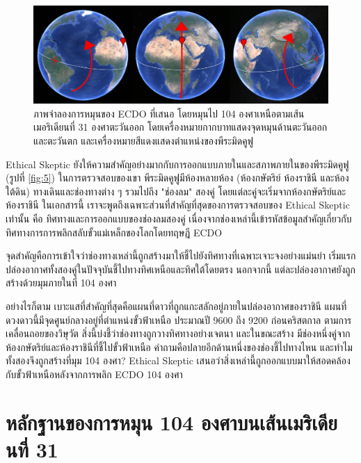 \documentclass[10pt,twocolumn,letterpaper]{article}
\begin{document}
\begin{figure}[b]
\begin{center}
\includegraphics[width=1\textwidth]{drawing.jpg}
\end{center}
   \caption{ภาพจำลองการหมุนของ ECDO ที่เสนอ โดยหมุนไป 104 องศาเหนือตามเส้นเมอริเดียนที่ 31 องศาตะวันออก โดยเครื่องหมายกากบาทแสดงจุดหมุนด้านตะวันออกและตะวันตก และเครื่องหมายสีแดงแสดงตำแหน่งของพีระมิดคูฟู }
\label{fig:6}
\end{figure}
Ethical Skeptic ยังให้ความสำคัญอย่างมากกับการออกแบบภายในและสภาพภายในของพีระมิดคูฟู (รูปที่ \ref{fig:5}) ในการตรวจสอบของเขา \cite{28} พีระมิดคูฟูมีห้องหลายห้อง (ห้องกษัตริย์ ห้องราชินี และห้องใต้ดิน) ทางเดินและช่องทางต่าง ๆ รวมไปถึง "ช่องลม" สองคู่ โดยแต่ละคู่จะเริ่มจากห้องกษัตริย์และห้องราชินี \cite{29,30} ในเอกสารนี้ เราจะพูดถึงเฉพาะส่วนที่สำคัญที่สุดของการตรวจสอบของ Ethical Skeptic เท่านั้น คือ ทิศทางและการออกแบบของช่องลมสองคู่ เนื่องจากช่องเหล่านี้เข้ารหัสข้อมูลสำคัญเกี่ยวกับทิศทางการการพลิกสลับขั้วแม่เหล็กของโลกโดยทฤษฎี ECDO 

จุดสำคัญคือการเข้าใจว่าช่องทางเหล่านี้ถูกสร้างมาให้ชี้ไปยังทิศทางที่เฉพาะเจาะจงอย่างแม่นยำ เริ่มแรก ปล่องอากาศทั้งสองคู่ในปัจจุบันชี้ไปทางทิศเหนือและทิศใต้โดยตรง นอกจากนี้ แต่ละปล่องอากาศยังถูกสร้างด้วยมุมภายในที่ 104 องศา

อย่างไรก็ตาม เบาะแสที่สำคัญที่สุดคือแผนที่ดาวที่ถูกแกะสลักอยู่ภายในปล่องอากาศของราชินี  แผนที่ดวงดาวนี้มีจุดศูนย์กลางอยู่ที่ตำแหน่งขั้วฟ้าเหนือ ประมาณปี 9600 ถึง 9200 ก่อนคริสตกาล ตามการเคลื่อนถอยของวิษุวัต  \cite{28} สิ่งนี้บ่งชี้ว่าช่องทางถูกวางทิศทางอย่างเจตนา และในขณะสร้าง มีช่องหนึ่งคู่จากห้องกษัตริย์และห้องราชินีที่ชี้ไปขั้วฟ้าเหนือ คำถามคือปลายอีกด้านหนึ่งของช่องชี้ไปทางไหน และทำไมทั้งสองจึงถูกสร้างที่มุม 104 องศา? Ethical Skeptic เสนอว่าสิ่งเหล่านี้ถูกออกแบบมาให้สอดคล้องกับขั้วฟ้าเหนือหลังจากการพลิก ECDO 104 องศา

\section{หลักฐานของการหมุน 104 องศาบนเส้นเมริเดียนที่ 31}
\end{document}
